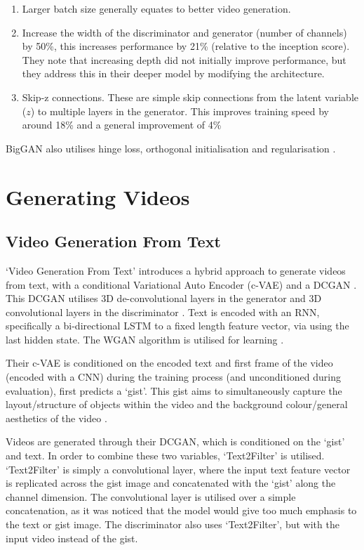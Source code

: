 \documentclass{report}
\theoremstyle{plain}
\theoremstyle{definition}
\theoremstyle{remark}
\numberwithin{equation}{section}
\numberwithin{figure}{section}
\newcommand{\<}{\langle}
\renewcommand{\>}{\rangle}
\begin{document}
\begin{enumerate}
    \item Larger batch size generally equates to better video generation.
    \item Increase the width of the discriminator and generator (number of channels) by 50\%, this increases performance by 21\% (relative to the inception score). They note that increasing depth did not initially improve performance, but they address this in their deeper model by modifying the architecture.
    \item Skip-z connections. These are simple skip connections from the latent variable ($z$) to multiple layers in the generator. This improves training speed by around 18\% and a general improvement of 4\%
\end{enumerate}

BigGAN also utilises hinge loss, orthogonal initialisation and regularisation \cite{brock_large_2018}. 

\section{Generating Videos}

\subsection{Video Generation From Text}
`Video Generation From Text' \cite{li_video_2017} introduces a hybrid approach to generate videos from text, with a conditional Variational Auto Encoder (c-VAE) and a DCGAN \cite{radford_unsupervised_2015}. This DCGAN utilises 3D de-convolutional layers in the generator and 3D convolutional layers in the discriminator \cite{li_video_2017}. Text is encoded with an RNN, specifically a bi-directional LSTM to a fixed length feature vector, via using the last hidden state. The WGAN algorithm is utilised for learning \cite{arjovsky_wasserstein_2017}. 

Their c-VAE is conditioned on the encoded text and first frame of the video (encoded with a CNN) during the training process (and unconditioned during evaluation), first predicts a `gist'. This gist aims to simultaneously capture the layout/structure of objects within the video and the background colour/general aesthetics of the video \cite{li_video_2017}. 

Videos are generated through their DCGAN, which is conditioned on the `gist' and text. In order to combine these two variables, ‘Text2Filter’ is utilised. `Text2Filter' is simply a convolutional layer, where the input text feature vector is replicated across the gist image and concatenated with the `gist' along the channel dimension. The convolutional layer is utilised over a simple concatenation, as it was noticed that the model would give too much emphasis to the text or gist image. The discriminator also uses ‘Text2Filter’, but with the input video instead of the gist.
\end{document}
